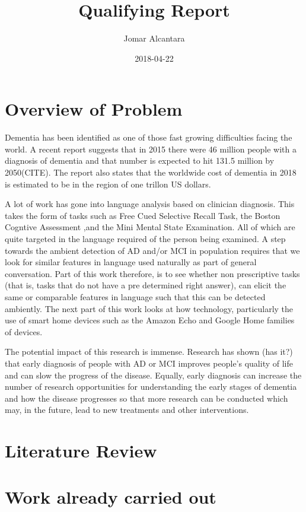 \documentclass{article}
\title{Qualifying Report}
\date{2018-04-22}
\author{Jomar Alcantara}
\begin{document}
	\maketitle
	\newpage
	\section{Overview of Problem}
	
	Dementia has been identified as one of those fast growing difficulties facing the world. A recent report suggests that in 2015 there were 46 million people with a diagnosis of dementia and that number is expected to hit 131.5 million by 2050(CITE). The report also states that the worldwide cost of dementia in 2018 is estimated to be in the region of one trillon US dollars.
	\newline
	\par
	A lot of work has gone into language analysis based on clinician diagnosis. This takes the form of tasks such as Free Cued Selective Recall Task, the Boston Cogntive Assessment ,and the Mini Mental State Examination. All of which are quite targeted in the language required of the person being examined. A step towards the ambient detection of AD and/or MCI in population requires that we look for similar features in language used naturally as part of general conversation. Part of this work therefore, is to see whether non prescriptive tasks (that is, tasks that do not have a pre determined right answer), can elicit the same or comparable features in language such that this can be detected ambiently. The next part of this work looks at how technology, particularly the use of smart home devices such as the Amazon Echo and Google Home families of devices. 
	\newline
	\par
	The potential impact of this research is immense. Research has shown (has it?) that early diagnosis of people with AD or MCI improves people's quality of life and can slow the progress of the disease. Equally, early diagnosis can increase the number of research opportunities for understanding the early stages of dementia and how the disease progresses so that more research can be conducted which may, in the future, lead to new treatments and other interventions.
	
	\section{Literature Review}
	
	\section{Work already carried out}
	
\end{document}
